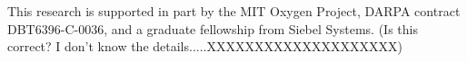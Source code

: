This research is supported in part by the MIT Oxygen Project, DARPA
contract DBT6396-C-0036, and a graduate fellowship from Siebel Systems.
(Is this correct? I don't know the details.....XXXXXXXXXXXXXXXXXXXX)
%
%
% 

